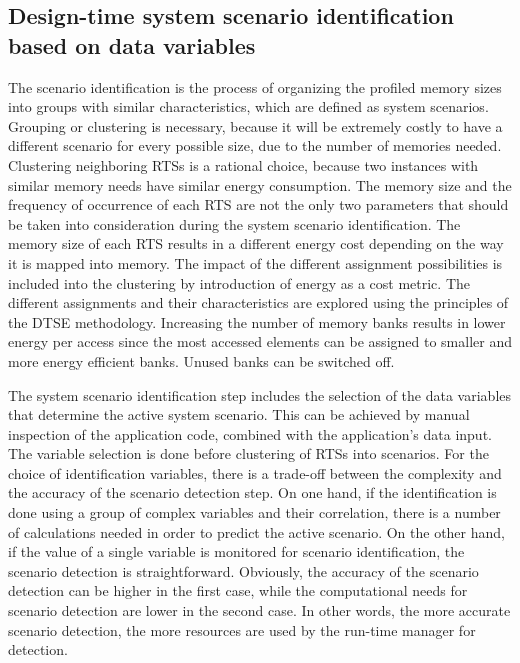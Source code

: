 \subsection{Design-time system scenario identification based on data variables}

The scenario identification is the process of organizing the profiled memory sizes into groups with similar characteristics, which are defined as system scenarios. 
Grouping or clustering is necessary, because it will be extremely costly to have a different scenario for every possible size, due to the number of memories needed. 
Clustering neighboring RTSs is a rational choice, because two instances with similar memory needs have similar energy consumption. 
The memory size and the frequency of occurrence of each RTS are not the only two parameters that should be taken into consideration during the system scenario identification. 
The memory size of each RTS results in a different energy cost depending on the way it is mapped into memory. 
The impact of the different assignment possibilities is included into the clustering by introduction of energy as a cost metric. 
The different assignments and their characteristics are explored using the principles of the DTSE methodology.
Increasing the number of memory banks results in lower energy per access since the most accessed elements can be assigned to smaller and more energy efficient banks. 
Unused banks can be switched off.

The system scenario identification step includes the selection of the data variables that determine the active system scenario. 
This can be achieved by manual inspection of the application code, combined with the application's data input.
The variable selection is done before clustering of RTSs into scenarios.
For the choice of identification variables, there is a trade-off between the complexity and the accuracy of the scenario detection step.
On one hand, if the identification is done using a group of complex variables and their correlation, there is a number of calculations needed in order to predict the active scenario. 
On the other hand, if the value of a single variable is monitored for scenario identification, the scenario detection is straightforward.
Obviously, the accuracy of the scenario detection can be higher in the first case, while the computational needs for scenario detection are lower in the second case.
In other words, the more accurate scenario detection, the more resources are used by the run-time manager for detection.

